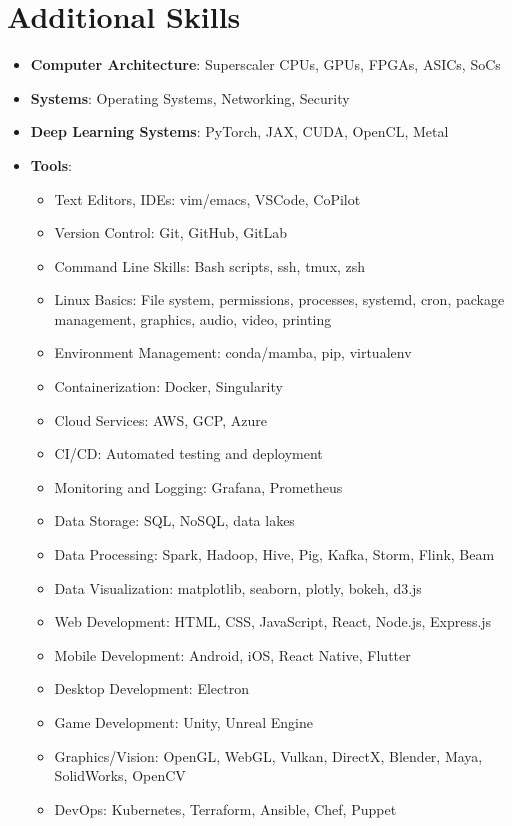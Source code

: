 \documentclass[12pt]{article}
\begin{document}
\section*{Additional Skills}
\begin{itemize}
    \item \textbf{Computer Architecture}: Superscaler CPUs, GPUs, FPGAs, ASICs, SoCs
    \item \textbf{Systems}: Operating Systems, Networking, Security
    \item \textbf{Deep Learning Systems}: PyTorch, JAX, CUDA, OpenCL, Metal
    \item \textbf{Tools}:
    \begin{itemize}
        \item Text Editors, IDEs: vim/emacs, VSCode, CoPilot
        \item Version Control: Git, GitHub, GitLab
        \item Command Line Skills: Bash scripts, ssh, tmux, zsh
        \item Linux Basics: File system, permissions, processes, systemd, cron, package management, graphics, audio, video, printing
        \item Environment Management: conda/mamba, pip, virtualenv
        \item Containerization: Docker, Singularity
        \item Cloud Services: AWS, GCP, Azure
        \item CI/CD: Automated testing and deployment
        \item Monitoring and Logging: Grafana, Prometheus
        \item Data Storage: SQL, NoSQL, data lakes
        \item Data Processing: Spark, Hadoop, Hive, Pig, Kafka, Storm, Flink, Beam
        \item Data Visualization: matplotlib, seaborn, plotly, bokeh, d3.js
        \item Web Development: HTML, CSS, JavaScript, React, Node.js, Express.js
        \item Mobile Development: Android, iOS, React Native, Flutter
        \item Desktop Development: Electron
        \item Game Development: Unity, Unreal Engine
        \item Graphics/Vision: OpenGL, WebGL, Vulkan, DirectX, Blender, Maya, SolidWorks, OpenCV
        \item DevOps: Kubernetes, Terraform, Ansible, Chef, Puppet
    \end{itemize}
\end{itemize}
\end{document}

